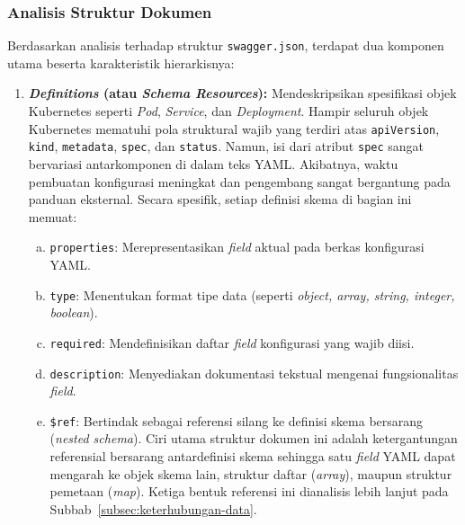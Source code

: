     \subsubsection{Analisis Struktur Dokumen}
    Berdasarkan analisis terhadap struktur \texttt{swagger.json}, terdapat dua komponen utama beserta karakteristik hierarkisnya:
    \begin{enumerate}
        \item \textbf{\textit{Definitions} (atau \textit{Schema Resources}):} Mendeskripsikan spesifikasi objek Kubernetes seperti \textit{Pod}, \textit{Service}, dan \textit{Deployment}. Hampir seluruh objek Kubernetes mematuhi pola struktural wajib yang terdiri atas \texttt{apiVersion}, \texttt{kind}, \texttt{metadata}, \texttt{spec}, dan \texttt{status}. Namun, isi dari atribut \texttt{spec} sangat bervariasi antarkomponen di dalam teks YAML. Akibatnya, waktu pembuatan konfigurasi meningkat dan pengembang sangat bergantung pada panduan eksternal. Secara spesifik, setiap definisi skema di bagian ini memuat:
        \begin{enumerate}[a.]
            \item \texttt{properties}: Merepresentasikan \textit{field} aktual pada berkas konfigurasi YAML.
            \item \texttt{type}: Menentukan format tipe data (seperti \textit{object, array, string, integer, boolean}).
            \item \texttt{required}: Mendefinisikan daftar \textit{field} konfigurasi yang wajib diisi.
            \item \texttt{description}: Menyediakan dokumentasi tekstual mengenai fungsionalitas \textit{field}.
            \item \texttt{\$ref}: Bertindak sebagai referensi silang ke definisi skema bersarang (\textit{nested schema}). Ciri utama struktur dokumen ini adalah ketergantungan referensial bersarang antardefinisi skema sehingga satu \textit{field} YAML dapat mengarah ke objek skema lain, struktur daftar (\textit{array}), maupun struktur pemetaan (\textit{map}). Ketiga bentuk referensi ini dianalisis lebih lanjut pada Subbab~\ref{subsec:keterhubungan-data}.
        \end{enumerate}


\end{enumerate}
